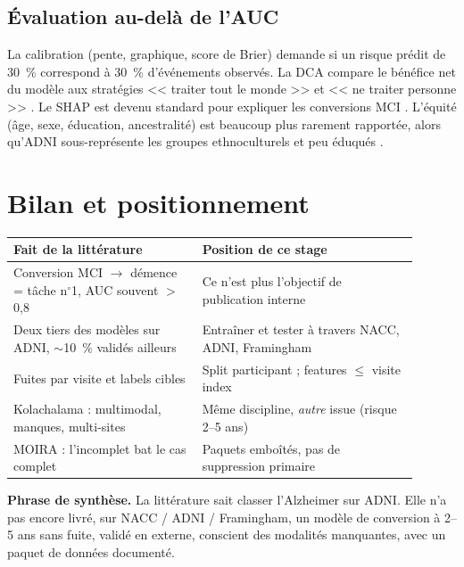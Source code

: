\subsection{Évaluation au-delà de l'AUC}

La calibration (pente, graphique, score de Brier) demande si un risque prédit de 30~\% correspond à 30~\% d'événements observés. La \ac{DCA} compare le bénéfice net du modèle aux stratégies << traiter tout le monde >> et << ne traiter personne >> \cite{chen2024probast,cns2024ptau}. Le \ac{SHAP} est devenu standard pour expliquer les conversions MCI \cite{chun2022shap}. L'équité (âge, sexe, éducation, ancestralité) est beaucoup plus rarement rapportée, alors qu'ADNI sous-représente les groupes ethnoculturels et peu éduqués \cite{ashford2022adni}.

\section{Bilan et positionnement}

\begin{center}
\begin{tabular}{p{0.42\linewidth}p{0.48\linewidth}}
\hline
\textbf{Fait de la littérature} & \textbf{Position de ce stage} \\
\hline
Conversion MCI $\rightarrow$ démence = tâche n$^\circ$1, AUC souvent $>$ 0,8 & Ce n'est plus l'objectif de publication interne \\
Deux tiers des modèles sur ADNI, $\sim$10~\% validés ailleurs & Entraîner et tester à travers NACC, ADNI, Framingham \\
Fuites par visite et labels cibles & Split participant ; features $\leq$ visite index \\
Kolachalama : multimodal, manques, multi-sites & Même discipline, \emph{autre} issue (risque 2--5 ans) \\
MOIRA : l'incomplet bat le cas complet & Paquets emboîtés, pas de suppression primaire \\
\hline
\end{tabular}
\end{center}

\vspace{0.4cm}
\noindent\textbf{Phrase de synthèse.} La littérature sait classer l'Alzheimer sur ADNI. Elle n'a pas encore livré, sur NACC / ADNI / Framingham, un modèle de conversion à 2--5 ans sans fuite, validé en externe, conscient des modalités manquantes, avec un paquet de données documenté.

